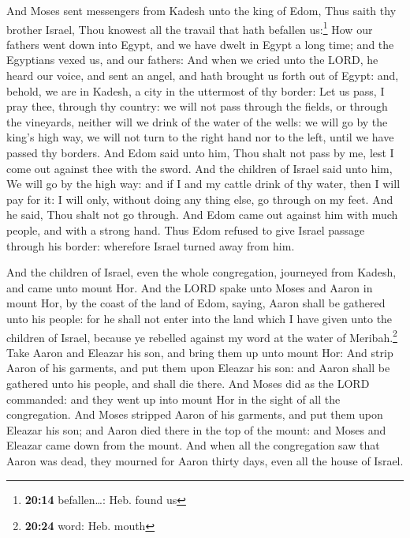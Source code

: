  And Moses sent messengers from Kadesh unto the king of
Edom, Thus saith thy brother Israel, Thou knowest all the travail that
hath befallen us:\footnote{\textbf{20:14} befallen\ldots: Heb. found us}
 How our fathers went down into Egypt, and we have dwelt
in Egypt a long time; and the Egyptians vexed us, and our fathers:
 And when we cried unto the LORD, he heard our voice, and
sent an angel, and hath brought us forth out of Egypt: and, behold, we
are in Kadesh, a city in the uttermost of thy border: 
Let us pass, I pray thee, through thy country: we will not pass through
the fields, or through the vineyards, neither will we drink of the water
of the wells: we will go by the king's high way, we will not turn to the
right hand nor to the left, until we have passed thy borders.
 And Edom said unto him, Thou shalt not pass by me, lest
I come out against thee with the sword.  And the children
of Israel said unto him, We will go by the high way: and if I and my
cattle drink of thy water, then I will pay for it: I will only, without
doing any thing else, go through on my feet.  And he
said, Thou shalt not go through. And Edom came out against him with much
people, and with a strong hand.  Thus Edom refused to
give Israel passage through his border: wherefore Israel turned away
from him.

 And the children of Israel, even the whole congregation,
journeyed from Kadesh, and came unto mount Hor.  And the
LORD spake unto Moses and Aaron in mount Hor, by the coast of the land
of Edom, saying,  Aaron shall be gathered unto his
people: for he shall not enter into the land which I have given unto the
children of Israel, because ye rebelled against my word at the water of
Meribah.\footnote{\textbf{20:24} word: Heb. mouth}  Take
Aaron and Eleazar his son, and bring them up unto mount Hor:
 And strip Aaron of his garments, and put them upon
Eleazar his son: and Aaron shall be gathered unto his people, and shall
die there.  And Moses did as the LORD commanded: and they
went up into mount Hor in the sight of all the congregation.
 And Moses stripped Aaron of his garments, and put them
upon Eleazar his son; and Aaron died there in the top of the mount: and
Moses and Eleazar came down from the mount.  And when all
the congregation saw that Aaron was dead, they mourned for Aaron thirty
days, even all the house of Israel.


